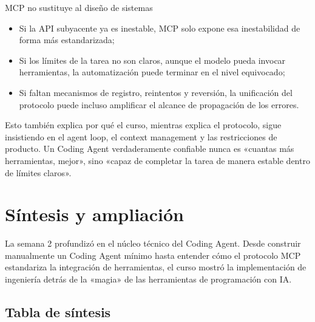 \documentclass[a4paper]{article}
\begin{document}
\begin{warningbox}{MCP no sustituye al diseño de sistemas}
\begin{itemize}
    \item Si la API subyacente ya es inestable, MCP solo expone esa inestabilidad de forma más estandarizada;
    \item Si los límites de la tarea no son claros, aunque el modelo pueda invocar herramientas, la automatización puede terminar en el nivel equivocado;
    \item Si faltan mecanismos de registro, reintentos y reversión, la unificación del protocolo puede incluso amplificar el alcance de propagación de los errores.
\end{itemize}
\end{warningbox}

Esto también explica por qué el curso, mientras explica el protocolo, sigue insistiendo en el agent loop, el context management y las restricciones de producto. Un Coding Agent verdaderamente confiable nunca es «cuantas más herramientas, mejor», sino «capaz de completar la tarea de manera estable dentro de límites claros».
\section{Síntesis y ampliación}

La semana 2 profundizó en el núcleo técnico del Coding Agent. Desde construir manualmente un Coding Agent mínimo hasta entender cómo el protocolo MCP estandariza la integración de herramientas, el curso mostró la implementación de ingeniería detrás de la «magia» de las herramientas de programación con IA.

\subsection{Tabla de síntesis}
\end{document}
